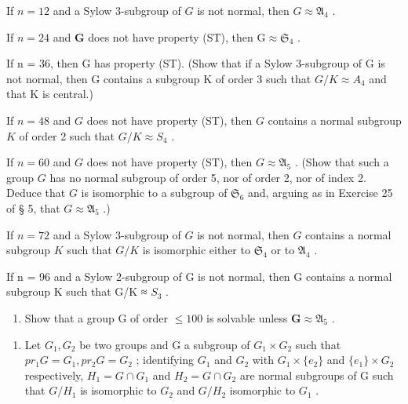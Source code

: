 If \(n = 12\) and a Sylow 3-subgroup of \(G\) is not normal, then \(G \approx \mathfrak{A}_4\) .

If \(n = 24\) and \(\mathbf{G}\) does not have property (ST), then \(\mathrm{G} \approx \mathfrak{S}_4\) .

If n = 36, then G has property (ST). (Show that if a Sylow 3-subgroup of G is not normal, then G contains a subgroup K of order 3 such that \(G/K \approx A_{4}\) and that K is central.)

If \(n = 48\) and \(G\) does not have property (ST), then \(G\) contains a normal subgroup \(K\) of order 2 such that \(G / K \approx S_4\) .

If \(n = 60\) and \(G\) does not have property (ST), then \(G \approx \mathfrak{A}_5\) . (Show that such a group \(G\) has no normal subgroup of order 5, nor of order 2, nor of index 2. Deduce that \(G\) is isomorphic to a subgroup of \(\mathfrak{S}_6\) and, arguing as in Exercise 25 of § 5, that \(G \approx \mathfrak{A}_5\) .)

If \(n = 72\) and a Sylow 3-subgroup of \(G\) is not normal, then \(G\) contains a normal subgroup \(K\) such that \(G / K\) is isomorphic either to \(\mathfrak{S}_4\) or to \(\mathfrak{A}_4\) .

If n = 96 and a Sylow 2-subgroup of G is not normal, then G contains a normal subgroup K such that G/K ≈ \(S_{3}\) .

\begin{enumerate}
\def\labelenumi{(\alph{enumi})}
\setcounter{enumi}{3}
\tightlist
\item
  Show that a group G of order \(\leqslant 100\) is solvable unless \(\mathbf{G} \approx \mathfrak{A}_5\) .
\end{enumerate}

\begin{enumerate}
\def\labelenumi{\arabic{enumi}.}
\setcounter{enumi}{39}
\tightlist
\item
  Let \(G_{1}, G_{2}\) be two groups and G a subgroup of \(G_{1} \times G_{2}\) such that \(pr_{1} G = G_{1}, pr_{2} G = G_{2}\) ; identifying \(G_{1}\) and \(G_{2}\) with \(G_{1} \times \{e_{2}\}\) and \(\{e_{1}\} \times G_{2}\) respectively, \(H_{1} = G \cap G_{1}\) and \(H_{2} = G \cap G_{2}\) are normal subgroups of G such that \(G/H_{1}\) is isomorphic to \(G_{2}\) and \(G/H_{2}\) isomorphic to \(G_{1}\) .
\end{enumerate}

